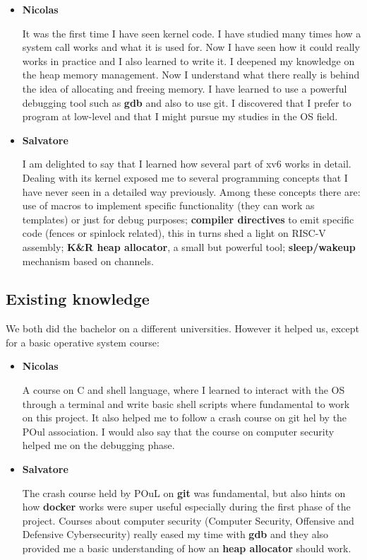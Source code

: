 \documentclass[10pt,a4]{article}
\begin{document}
\begin{itemize}
    \item \textbf{Nicolas}
    
    It was the first time I have seen kernel code. I have studied many times how a system call works and 
    what it is used for. Now I have seen how it could really works in practice and I also learned to write it. 
    I deepened my knowledge on the heap memory management. 
    Now I understand what there really is behind the idea of allocating and freeing memory. 
    I have learned to use a powerful debugging tool such as \textbf{gdb} and also to use git. 
    I discovered that I prefer to program at low-level and that I might pursue my studies in the OS field.
    
    
    \item \textbf{Salvatore}
    
    I am delighted to say that I learned how several part of xv6 works in detail. 
    Dealing with its kernel exposed me to several programming concepts that I have never seen in a detailed way previously. 
    Among these concepts there are: use of macros to implement specific functionality (they can work as templates) 
    or just for debug purposes; 
    \textbf{compiler directives} to emit specific code (fences or spinlock related), this in turns shed a light on RISC-V assembly;
    \textbf{K\&R heap allocator}, a small but powerful tool; \textbf{sleep/wakeup} mechanism based on channels.

\end{itemize}

 

\subsection{Existing knowledge}

We both did the bachelor on a different universities. However it helped us, except for a basic operative system course:
\begin{itemize}
    \item \textbf{Nicolas}
    
    A course on C and shell language, where I learned to interact with the OS through a terminal and 
    write basic shell scripts where fundamental to work on this project. 
    It also helped me to follow a crash course on git hel by the POul association. 
    I would also say that the course on computer security helped me on the debugging phase.
    \item \textbf{Salvatore} 
    
    The crash course held by POuL on \textbf{git} was fundamental, 
    but also hints on how \textbf{docker} works were super useful especially during the first phase of the project.
    Courses about computer security (Computer Security, Offensive and Defensive Cybersecurity) 
    really eased my time with \textbf{gdb} and they also provided me a basic understanding of how an \textbf{heap allocator} should work.
\end{itemize}
\end{document}
